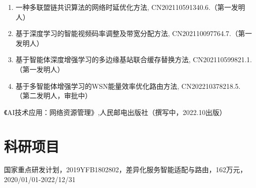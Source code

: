 \documentclass{resume}
\begin{document}
\begin{enumerate}
    \item 一种多联盟链共识算法的网络时延优化方法, CN202110591340.6.（第一发明人）
    \item 基于深度学习的智能视频码率调整及带宽分配方法, CN202110097764.7.（第一发明人）
    \item 基于智能体深度增强学习的多边缘基站联合缓存替换方法, CN202110599821.1.（第一发明人）
    \item 基于多智能体增强学习的WSN能量效率优化路由方法, CN202210378218.5.（第二发明人，审批中）
\end{enumerate}
《AI技术应用：网络资源管理》,人民邮电出版社（撰写中，2022.10出版）


\section{科研项目}



国家重点研发计划，2019YFB1802802，差异化服务智能适配与路由，162万元，2020/01/01-2022/12/31
\end{document}
